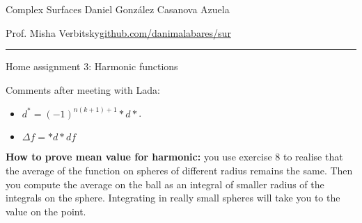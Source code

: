 
\setcounter{secnumdepth}{2}



\begin{minipage}{\textwidth}
	\begin{minipage}{1\textwidth}
		Complex Surfaces \hfill Daniel González Casanova Azuela
		
		{\small Prof. Misha Verbitsky\hfill\href{https://github.com/danimalabares/sur}{github.com/danimalabares/sur}}
	\end{minipage}
\end{minipage}\vspace{.2cm}\hrule

\vspace{10pt}
{\huge Home assignment 3: Harmonic functions}

Comments after meeting with Lada:
\begin{itemize}
\item \(d^* =(-1)^{n(k+1)+1}* d *\).
\item \(\Delta f= * d * df\)
\end{itemize}

\textbf{How to prove mean value for harmonic:} you use exercise 8 to realise that the average of the function on spheres of different radius remains the same. Then you compute the average on the ball as an integral of smaller radius of the integrals on the sphere. Integrating in really small spheres will take you to the value on the point.


